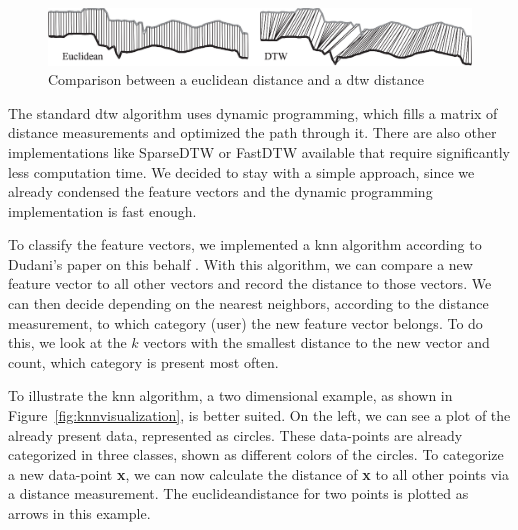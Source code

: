 \begin{figure}
    \centering
    \includegraphics[width=\textwidth]{figures/EuclideanvsDTW.png}
    \caption{Comparison between a euclidean distance and a \gls{dtw} distance \cite{keogh2005exact}}
    \label{fig:euclideandtw}
\end{figure}

The standard \gls{dtw} algorithm uses dynamic programming, which fills a matrix of distance measurements and optimized the path through it. There are also other implementations like SparseDTW or FastDTW available that require significantly less computation time. We decided to stay with a simple approach, since we already condensed the feature vectors and the dynamic programming implementation is fast enough.

To classify the feature vectors, we implemented a \gls{knn} algorithm according to Dudani's paper on this behalf \cite{dudani1976distance}. With this algorithm, we can compare a new feature vector to all other vectors and record the distance to those vectors. We can then decide depending on the nearest neighbors, according to the distance measurement, to which category (\ie user) the new feature vector belongs. To do this, we look at the $k$ vectors with the smallest distance to the new vector and count, which category is present most often.

To illustrate the \gls{knn} algorithm, a two dimensional example, as shown in Figure~\ref{fig:knnvisualization}, is better suited. On the left, we can see a plot of the already present data, represented as circles. These data-points are already categorized in three classes, shown as different colors of the circles. To categorize a new data-point \textbf{x}, we can now calculate the distance of \textbf{x} to all other points via a distance measurement. The \gls{euclideandistance} for two points is plotted as arrows in this example.

